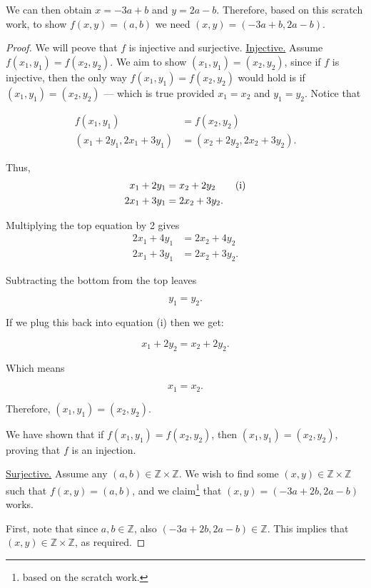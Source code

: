 \documentclass{amsart}
\theoremstyle{definition}
\theoremstyle{definition}
\theoremstyle{remark}
\begin{document}
We can then obtain $x=-3a+b$ and $y=2a-b$. Therefore, based on this scratch work, to show $f(x,y)=(a, b)$ we need $(x,y)=(-3a+b, 2a-b)$.

\begin{proof}
      We will peove that $f$ is injective and surjective.
      \medskip
      \underline{Injective.} \quad Assume $f(x_1, y_1) = f(x_2, y_2)$. We aim to show $(x_1, y_1) = (x_2, y_2)$, since if $f$ is injective, then the only way $f(x_1, y_1) = f(x_2, y_2)$ would hold is if $(x_1, y_1) = (x_2, y_2)$ --- which is true provided $x_1=x_2$ and $y_1=y_2$. Notice that

      \begin{align*}
            f(x_1, y_1) &= f(x_2, y_2) \\
            (x_1+2y_1, 2x_1+3y_1) &= (x_2+2y_2, 2x_2+3y_2).
      \end{align*}

      Thus,
      \begin{align}
            x_1+2y_1 &= x_2+2y_2 \tag{i} \\
            2x_1+3y_1 &= 2x_2+3y_2. \notag
      \end{align}

      Multiplying the top equation by 2 gives
      \begin{align*}
            2x_1+4y_1 &= 2x_2+4y_2 \\
            2x_1+3y_1 &= 2x_2+3y_2.
      \end{align*}

      Subtracting the bottom from the top leaves

      \[ y_1 = y_2. \]

      If we plug this back into equation (i) then we get:

      \[x_1 + 2y_2 = x_2+2y_2.\]

      Which means

      \[x_1 = x_2.\]

      Therefore, $(x_1, y_1) = (x_2, y_2).$


      We have shown that if $f(x_1,y_1)=f(x_2,y_2)$, then $(x_1, y_1)=(x_2, y_2)$, proving that $f$ is an injection.

      \medskip
      \underline{Surjective.} \quad Assume any $(a,b)\in\mathbb{Z}\times\mathbb{Z}$. We wish to find some $(x,y)\in\mathbb{Z}\times\mathbb{Z}$ such that $f(x,y)=(a,b)$, and we claim\footnote{based on the scratch work.} that $(x,y)=(-3a+2b, 2a-b)$ works.


      First, note that since $a,b\in\mathbb{Z}$, also $(-3a+2b, 2a-b)\in\mathbb{Z}$. This implies that $(x,y)\in\mathbb{Z}\times\mathbb{Z}$, as required.



\end{proof}
\end{document}
